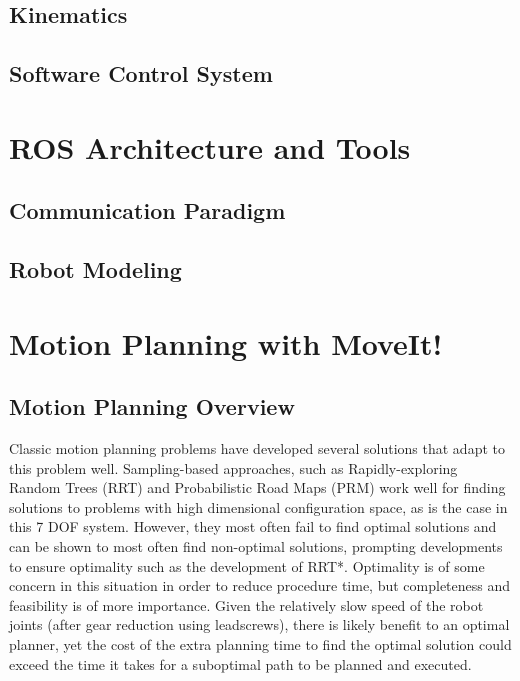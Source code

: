 \documentclass[12pt]{report}
\begin{document}
\subsection{Kinematics}

\subsection{Software Control System}


\section{ROS Architecture and Tools}

\subsection{Communication Paradigm}

\subsection{Robot Modeling}


\section{Motion Planning with MoveIt!}

\subsection{Motion Planning Overview}
Classic motion planning problems have developed several solutions that adapt to this problem well. Sampling-based approaches, such as Rapidly-exploring Random Trees (RRT) and Probabilistic Road Maps (PRM) work well for finding solutions to problems with high dimensional configuration space, as is the case in this 7 DOF system. \cite{planningAlgorithms} However, they most often fail to find optimal solutions and can be shown to most often find non-optimal solutions, prompting developments to ensure optimality such as the development of RRT*. \cite{rrtStar} Optimality is of some concern in this situation in order to reduce procedure time, but completeness and feasibility is of more importance. Given the relatively slow speed of the robot joints (after gear reduction using leadscrews), there is likely benefit to an optimal planner, yet the cost of the extra planning time to find the optimal solution could exceed the time it takes for a suboptimal path to be planned and executed.
\end{document}
